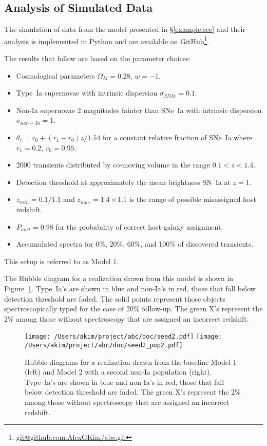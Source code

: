 \documentclass[preprint]{aastex}
\begin{document}
\subsection{Analysis of Simulated Data}
The simulation of data from the model presented in \S\ref{example:sec}
and their analysis is implemented in Python and are available
on GitHub\footnote{\url{git@github.com:AlexGKim/abc.git}}.

The results that follow are based on the parameter
choices:
\begin{itemize}
\item Cosmological parameters $\Omega_M=0.28$, $w=-1$.
\item Type~Ia supernovae with intrinsic dispersion $\sigma_{SNIa}=0.1$.
\item Non-Ia supernovae 2 magnitudes fainter than SNe~Ia with intrinsic
dispersion $\sigma_{non-Ia}=1$.
\item $\theta_r=r_0 + (r_1-r_0)z/1.54$ for a constant relative fraction of SNe~Ia where $r_1=0.2$,
$r_0=0.95$.
\item 2000 transients distributed by co-moving volume in the range $0.1<z<1.4$.
\item Detection threshold at approximately the mean brightness SN~Ia at $z=1$.
\item $z_{min}=0.1/1.1$ and $z_{max}=1.4\times 1.1$ is the range of possible misassigned
host redshift.
\item $P_{host}=0.98$ for the probability of correct host-galaxy assignment.
\item Accumulated spectra for 0\%, 20\%, 60\%, and 100\% of discovered transients.
\end{itemize}
This setup is referred to as Model 1.

The Hubble diagram for a realization drawn from this model is shown in Figure~\ref{hd:fig}.
Type~Ia's are shown in blue and non-Ia's in red, those that fall below detection threshold
are faded.  The solid points
represent those objects spectroscopically typed for the case of 20\% follow-up.
The green X's represent the 2\% among those without spectroscopy that
are assigned an incorrect redshift.

\begin{figure}[htbp] %
   \centering
   \texttt{[image: /Users/akim/project/abc/doc/seed2.pdf]}
   \texttt{[image: /Users/akim/project/abc/doc/seed2\_pop2.pdf]}  
\caption{Hubble diagrams for a realization drawn from the baseline Model 1 (left)
and Model 2 with a second non-Ia population (right).
Type~Ia's are shown in blue and non-Ia's in red, those that fall below detection threshold
are faded.  The green X's represent the 2\% among those without spectroscopy that
are assigned an incorrect redshift.
   \label{hd:fig}}
\end{figure}
\end{document}
